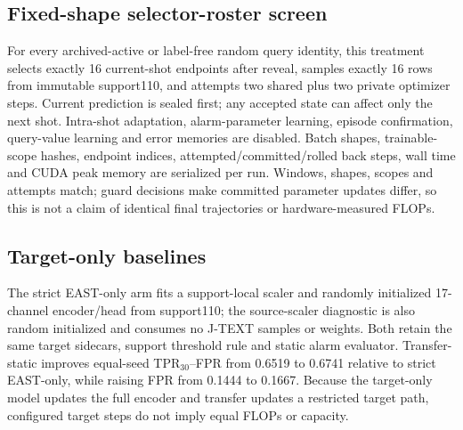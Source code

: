 \documentclass[10pt]{article}
\begin{document}
\subsection{Fixed-shape selector-roster screen}

For every archived-active or label-free random query identity, this treatment
selects exactly 16 current-shot endpoints after reveal, samples exactly 16 rows
from immutable support110, and attempts two shared plus two private optimizer
steps.  Current prediction is sealed first; any accepted state can affect only
the next shot.  Intra-shot adaptation, alarm-parameter learning, episode
confirmation, query-value learning and error memories are disabled.  Batch
shapes, trainable-scope hashes, endpoint indices, attempted/committed/rolled
back steps, wall time and CUDA peak memory are serialized per run.  Windows,
shapes, scopes and attempts match; guard decisions make committed parameter
updates differ, so this is not a claim of identical final trajectories or
hardware-measured FLOPs.

\begin{table}[h]
\centering
\small

\caption{Fixed-shape roster screen. Random is the within-seed mean of three block-count-matched schedules. The all-seed archived-roster superiority gate fails (0/3 better; one tie). This new operator does not estimate the adaptive selector policy; three random schedules are also insufficient to prove equivalence or a universal null effect.}
\end{table}

\subsection{Target-only baselines}

The strict EAST-only arm fits a support-local scaler and randomly initialized 17-channel encoder/head from support110; the source-scaler diagnostic is also random initialized and consumes no J-TEXT samples or weights.  Both retain the same target sidecars, support threshold rule and static alarm evaluator.  Transfer-static improves equal-seed TPR$_{30}$--FPR from 0.6519 to 0.6741 relative to strict EAST-only, while raising FPR from 0.1444 to 0.1667.  Because the target-only model updates the full encoder and transfer updates a restricted target path, configured target steps do not imply equal FLOPs or capacity.

\begin{table}[h]
\centering
\small

\caption{Random-initialized target controls and transferred static model on the balanced360 development stream.  Lead is the median over lead-qualified operational true positives.}
\end{table}
\end{document}
